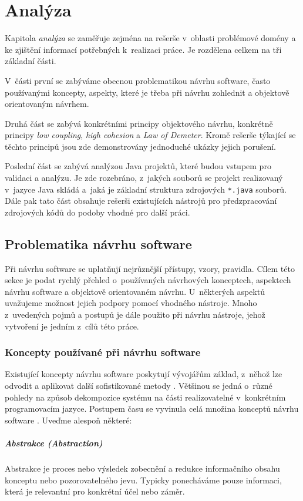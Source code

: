 \chapter{Analýza}
Kapitola \emph{analýza} se zaměřuje zejména na rešerše v~oblasti problémové domény a ke zjištění informací potřebných k~realizaci práce. Je rozdělena celkem na tři základní části.

V~části první se zabýváme obecnou problematikou návrhu software, často používanými koncepty, aspekty, které je třeba při návrhu zohlednit a objektově orientovaným návrhem.

Druhá část se zabývá konkrétními principy objektového návrhu, konkrétně principy \emph{low coupling}, \emph{high cohesion} a \emph{Law of Demeter}. Kromě rešerše týkající se těchto principů jsou zde demonstrovány jednoduché ukázky jejich porušení.

Poslední část se zabývá analýzou Java projektů, které budou vstupem pro validaci a analýzu. Je zde rozebráno, z~jakých souborů se projekt realizovaný v~jazyce Java skládá a~jaká je základní struktura zdrojových \verb+*.java+ souborů. Dále pak tato část obsahuje rešerši existujících nástrojů pro předzpracování zdrojových kódů do podoby vhodné pro další práci.
\section{Problematika návrhu software}
Při návrhu software se uplatňují nejrůznější přístupy, vzory, pravidla. Cílem této sekce je podat rychlý přehled o~používaných návrhových konceptech, aspektech návrhu software a objektově orientovaném návrhu. U~některých aspektů uvažujeme možnost jejich podpory pomocí vhodného nástroje. Mnoho z~uvedených pojmů a postupů je dále použito při návrhu nástroje, jehož vytvoření je jedním z~cílů této práce.

\subsection{Koncepty používané při návrhu software}
Existující koncepty návrhu software poskytují vývojářům základ, z~něhož lze odvodit a aplikovat další sofistikované metody \cite{wiki:software_design}. Většinou se jedná o~různé pohledy na způsob dekompozice systému na části realizovatelné v~konkrétním programovacím jazyce. Postupem času se vyvinula celá množina konceptů návrhu software \cite{swengineeringconcepts}. Uveďme alespoň některé:

\paragraph{Abstrakce (Abstraction)} Abstrakce je proces nebo výsledek zobecnění a redukce informačního obsahu konceptu nebo pozorovatelného jevu. Typicky ponecháváme pouze \mbox{informaci}, která je relevantní pro konkrétní účel nebo záměr.

